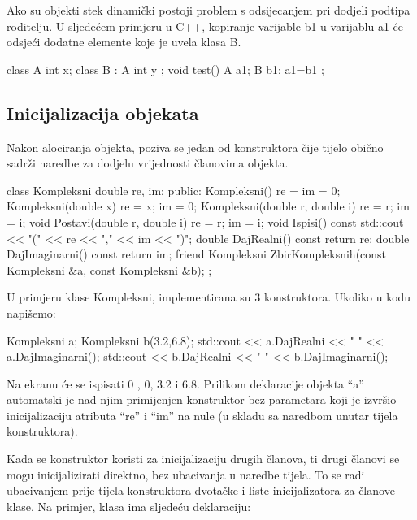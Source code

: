 \documentclass[11pt]{book}
\begin{document}
Ako su objekti stek dinamički postoji problem s odsijecanjem pri dodjeli podtipa roditelju. U sljedećem primjeru u C++, kopiranje varijable b1 u varijablu a1 će odsjeći dodatne elemente koje je uvela klasa B.

\begin{shortlisting}
  class A { int x; }
  class B : A { int y ;}
  void test() {
      A a1;
      B b1;
      a1=b1 ;
    }
\end{shortlisting}

\subsection{Inicijalizacija objekata}

Nakon alociranja objekta, poziva se jedan od konstruktora čije tijelo obično sadrži naredbe za dodjelu vrijednosti članovima objekta.

\begin{shortlisting}
  class Kompleksni {
      double re, im;
      public:
      Kompleksni() { re = im = 0; }
      Kompleksni(double x) { re = x; im = 0; }
      Kompleksni(double r, double i) { re = r; im = i; }
      void Postavi(double r, double i) { re = r; im = i; }
      void Ispisi() const { std::cout << "(" << re << "," << im << ")"; }
      double DajRealni() const { return re; }
      double DajImaginarni() const { return im; }
      friend Kompleksni ZbirKompleksnih(const Kompleksni &a, const Kompleksni &b);
    };
\end{shortlisting}

U primjeru klase Kompleksni, implementirana su 3 konstruktora. Ukoliko u kodu napišemo:

\begin{shortlisting}
  Kompleksni a;
  Kompleksni b(3.2,6.8);
  std::cout << a.DajRealni << " " << a.DajImaginarni(); std::cout << b.DajRealni << " " << b.DajImaginarni();
\end{shortlisting}

Na ekranu će se ispisati 0 , 0, 3.2 i 6.8. Prilikom deklaracije objekta  “a”  automatski  je  nad  njim  primijenjen  konstruktor  bez  parametara  koji  je  izvršio inicijalizaciju atributa “re” i “im” na nule (u skladu sa naredbom unutar tijela konstruktora).

Kada se konstruktor koristi za inicijalizaciju drugih članova, ti drugi članovi se mogu inicijalizirati direktno, bez ubacivanja u naredbe tijela. To se radi ubacivanjem prije tijela konstruktora dvotačke i liste inicijalizatora za članove klase. Na primjer, klasa ima sljedeću deklaraciju:
\end{document}

